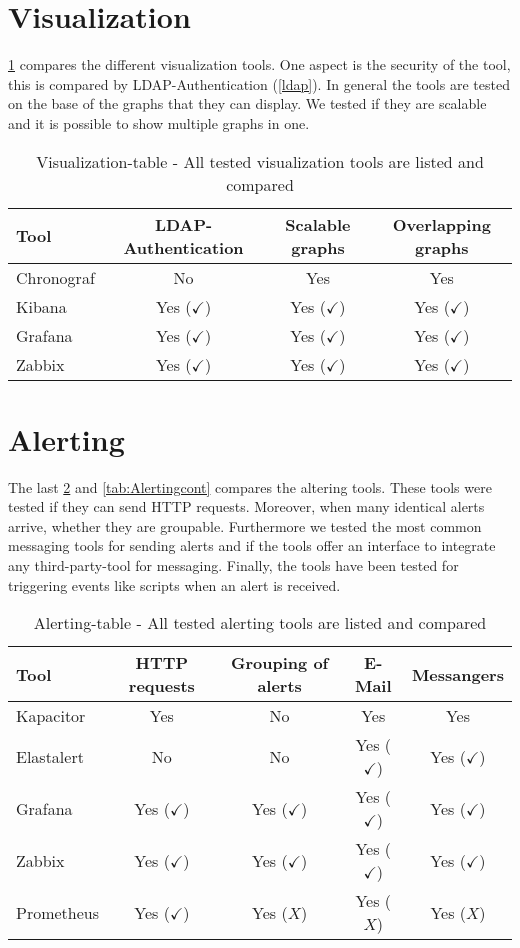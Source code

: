 \section{Visualization}
\cref{tab:Visualization} compares the different visualization tools. One aspect is the security of the tool, this is compared by LDAP-Authentication (\cref{ldap}). In general the tools are tested on the base of the graphs that they can display. We tested if they are scalable and it is possible to show multiple graphs in one. 
\begin{table}[H] 
\centering
\begin{tabular}{lccc}
	\hline
Tool & LDAP-Authentication         & Scalable graphs             & Overlapping graphs          \\
\hline
Chronograf & No & Yes & Yes \\
Kibana & Yes ($ \checkmark $) & Yes ($ \checkmark $) & Yes ($ \checkmark $)\\
Grafana & Yes ($ \checkmark $) & Yes ($ \checkmark $) & Yes ($ \checkmark $)\\
Zabbix & Yes ($ \checkmark $) & Yes ($ \checkmark $)  & Yes  ($ \checkmark $)\\
\hline
\end{tabular}
\caption{Visualization-table - All tested visualization tools are listed and compared}
\label{tab:Visualization}
\end{table}

\section{Alerting}
The last \cref{tab:Alerting} and \cref{tab:Alertingcont} compares the altering tools. These tools were tested if they can send HTTP requests. Moreover, when many identical alerts arrive, whether they are groupable. Furthermore we tested the most common messaging tools for sending alerts and if the tools offer an interface to integrate any third-party-tool for messaging. Finally, the tools have been tested for triggering events like scripts when an alert is received.
\begin{table}[H]
	\centering
	\begin{tabular}{lcccc}
		\hline
Tool & HTTP requests & Grouping of alerts & E-Mail & Messangers \\
\hline
Kapacitor & Yes  & No & Yes & Yes \\
Elastalert & No & No & Yes ($ \checkmark $) & Yes ($ \checkmark $) \\
Grafana & Yes ($ \checkmark $) & Yes ($ \checkmark $) & Yes ($ \checkmark $) & Yes ($ \checkmark $) \\
Zabbix & Yes ($ \checkmark $) & Yes ($ \checkmark $) & Yes ($ \checkmark $) & Yes ($ \checkmark $) \\
Prometheus & Yes ($ \checkmark $) & Yes ($ X $) & Yes ($ X $) & Yes ($ X $)\\
		\hline
	\end{tabular}
	\caption{Alerting-table - All tested alerting tools are listed and compared}
	\label{tab:Alerting}
\end{table}

